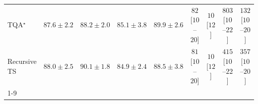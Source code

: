 \begin{tabular}{l|cccc|cccc|}
TQA$^\star$ & {\cellcolor[HTML]{046299}} \color[HTML]{F1F1F1} $87.6\pm 2.2$ & {\cellcolor[HTML]{045D92}} \color[HTML]{F1F1F1} $88.2\pm 2.0$ & {\cellcolor[HTML]{0F76B3}} \color[HTML]{F1F1F1} $85.1\pm 3.8$ & {\cellcolor[HTML]{034B76}} \color[HTML]{F1F1F1} $89.9\pm 2.6$ & {\cellcolor[HTML]{FEE6E3}} \color[HTML]{000000} $82$ [$10$--$20$] & {\cellcolor[HTML]{FFF7F3}} \color[HTML]{000000} $10$ [$12$] & {\cellcolor[HTML]{49006A}} \color[HTML]{F1F1F1} $803$ [$10$--$22$] & {\cellcolor[HTML]{FDDAD7}} \color[HTML]{000000} $132$ [$10$--$20$] \\
Recursive TS & {\cellcolor[HTML]{045F95}} \color[HTML]{F1F1F1} $88.0\pm 2.5$ & {\cellcolor[HTML]{034973}} \color[HTML]{F1F1F1} $90.1\pm 1.8$ & {\cellcolor[HTML]{1278B4}} \color[HTML]{F1F1F1} $84.9\pm 2.4$ & {\cellcolor[HTML]{045B8E}} \color[HTML]{F1F1F1} $88.5\pm 3.8$ & {\cellcolor[HTML]{FEE7E4}} \color[HTML]{000000} $81$ [$10$--$20$] & {\cellcolor[HTML]{FFF7F3}} \color[HTML]{000000} $10$ [$12$] & {\cellcolor[HTML]{F564A0}} \color[HTML]{F1F1F1} $415$ [$10$--$22$] & {\cellcolor[HTML]{F883AB}} \color[HTML]{F1F1F1} $357$ [$10$--$20$] \\
\cline{1-9}
\bottomrule
\end{tabular}
